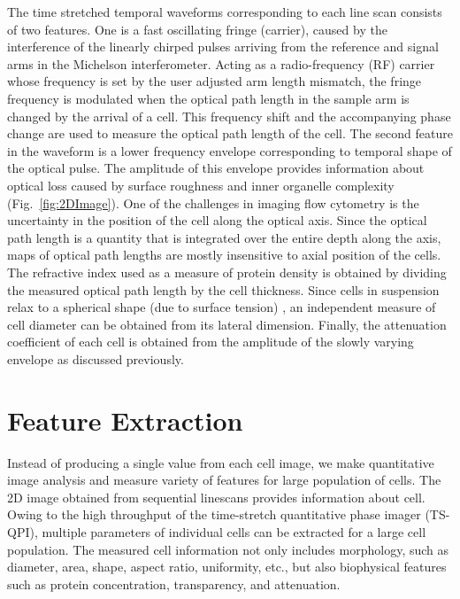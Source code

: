 \documentclass[aps,pra,preprint,superscriptaddress]{revtex4-1}
\begin{document}
The time stretched temporal waveforms corresponding to each line scan consists of two features. One is a fast oscillating fringe (carrier), caused by the interference of the linearly chirped pulses arriving from the reference and signal arms in the Michelson interferometer. Acting as a radio-frequency (RF) carrier whose frequency is set by the user adjusted arm length mismatch, the fringe frequency is modulated when the optical path length in the sample arm is changed by the arrival of a cell. This frequency shift and the accompanying phase change are used to measure the optical path length of the cell. The second feature in the waveform is a lower frequency envelope corresponding to temporal shape of the optical pulse. The amplitude of this envelope provides information about optical loss caused by surface roughness and inner organelle complexity (Fig.~\ref{fig:2DImage}). 
One of the challenges in imaging flow cytometry is the uncertainty in the position of the cell along the optical axis. Since the optical path length is a quantity that is integrated over the entire depth along the axis, maps of optical path lengths are mostly insensitive to axial position of the cells. The refractive index used as a measure of protein density is obtained by dividing the measured optical path length by the cell thickness. Since cells in suspension relax to a spherical shape (due to surface tension) \cite{revel1974adhesion,whur1977substrate}, an independent measure of cell diameter can be obtained from its lateral dimension. 
Finally, the attenuation coefficient of each cell is obtained from the amplitude of the slowly varying envelope as discussed previously.

\section{Feature Extraction}

Instead of producing a single value from each cell image, we make quantitative image analysis and measure variety of features for large population of cells. The 2D image obtained from sequential linescans provides information about cell. Owing to the high throughput of the time-stretch quantitative phase imager (TS-QPI), multiple parameters of individual cells can be extracted for a large cell population. The measured cell information not only includes morphology, such as diameter, area, shape, aspect ratio, uniformity, etc., but also biophysical features such as protein concentration, transparency, and attenuation.
\end{document}

